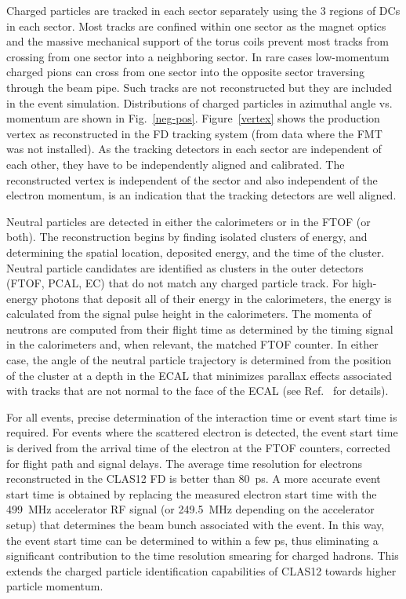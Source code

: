 \documentclass[final,3p,twocolumn]{elsarticle}
\begin{document}
Charged particles are tracked in each sector separately using the 3 regions of DCs in each sector. Most tracks
are confined within one sector as the magnet optics and the massive mechanical support of the torus coils prevent
most tracks from crossing from one sector into a neighboring sector. In rare cases low-momentum charged pions
can cross from one sector into the opposite sector traversing through the beam pipe. Such tracks are not
reconstructed but they are included in the event simulation. Distributions of charged particles in azimuthal angle
vs. momentum are shown in Fig.~\ref{neg-pos}. Figure~\ref{vertex} shows the production vertex as
reconstructed in the FD tracking system (from data where the FMT was not installed). As the tracking detectors in each sector 
are independent of each other, they have to be independently aligned and calibrated. The reconstructed 
vertex is independent of the sector and also independent of the electron momentum, is an indication that the 
tracking detectors are well aligned.  

Neutral particles are detected in either the calorimeters or in the FTOF (or both). The reconstruction begins by
finding isolated clusters of energy, and determining the spatial location, deposited energy, and the time of the
cluster. Neutral particle candidates are identified as clusters in the outer detectors (FTOF, PCAL, EC) that do
not match any charged particle track. For high-energy photons that deposit all of their energy in the calorimeters,
the energy is calculated from the signal pulse height in the calorimeters. The momenta of neutrons are computed
from their flight time as determined by the timing signal in the calorimeters and, when relevant, the matched
FTOF counter. In either case, the angle of the neutral particle trajectory is determined from the position of the
cluster at a depth in the ECAL that minimizes parallax effects associated with tracks that are not normal to the
face of the ECAL (see Ref.~\cite{ECAL} for details).

For all events, precise determination of the interaction time or event start time is required. For events where the
scattered electron is detected, the event start time is derived from the arrival time of the electron at the FTOF
counters, corrected for flight path and signal delays.  The average time resolution for electrons reconstructed in
the CLAS12 FD is better than 80~ps. A more accurate event start time is obtained by replacing the measured
electron start time with the 499~MHz accelerator RF signal (or 249.5~MHz depending on the accelerator setup)
that determines the beam bunch associated with the event. In this way, the event start time can be determined
to within a few ps, thus eliminating a significant contribution to the time resolution smearing for charged hadrons.
This extends the charged particle identification capabilities of CLAS12 towards higher particle momentum.
\end{document}
